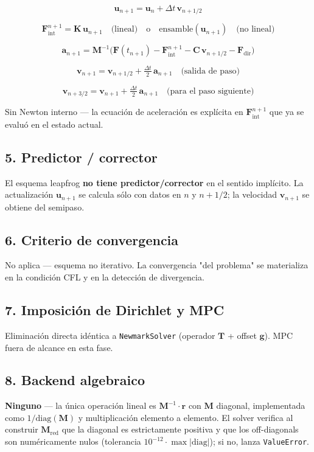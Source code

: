 \documentclass[11pt,letterpaper,oneside]{report}
\begin{document}
\[
\mathbf{u}_{n+1} = \mathbf{u}_n + \Delta t\,\mathbf{v}_{n+1/2}
\]

\[
\mathbf{F}_\text{int}^{n+1} = \mathbf{K}\,\mathbf{u}_{n+1} \quad\text{(lineal)} \quad\text{o}\quad \text{ensamble}(\mathbf{u}_{n+1}) \quad\text{(no lineal)}
\]

\[
\mathbf{a}_{n+1} = \mathbf{M}^{-1}\big(\mathbf{F}(t_{n+1}) - \mathbf{F}_\text{int}^{n+1} - \mathbf{C}\,\mathbf{v}_{n+1/2} - \mathbf{F}_\text{dir}\big)
\]

\[
\mathbf{v}_{n+1} = \mathbf{v}_{n+1/2} + \tfrac{\Delta t}{2}\,\mathbf{a}_{n+1} \quad\text{(salida de paso)}
\]

\[
\mathbf{v}_{n+3/2} = \mathbf{v}_{n+1} + \tfrac{\Delta t}{2}\,\mathbf{a}_{n+1} \quad\text{(para el paso siguiente)}
\]

Sin Newton interno --- la ecuación de aceleración es explícita en $\mathbf{F}_\text{int}^{n+1}$ que ya se evaluó en el estado actual.

\subsection{5. Predictor / corrector}

El esquema leapfrog \textbf{no tiene predictor/corrector} en el sentido implícito. La actualización $\mathbf{u}_{n+1}$ se calcula sólo con datos en $n$ y $n+1/2$; la velocidad $\mathbf{v}_{n+1}$ se obtiene del semipaso.

\subsection{6. Criterio de convergencia}

No aplica --- esquema no iterativo. La convergencia "del problema" se materializa en la condición CFL y en la detección de divergencia.

\subsection{7. Imposición de Dirichlet y MPC}

Eliminación directa idéntica a \texttt{NewmarkSolver} (operador $\mathbf{T}$ + offset $\mathbf{g}$). MPC fuera de alcance en esta fase.

\subsection{8. Backend algebraico}

\textbf{Ninguno} --- la única operación lineal es $\mathbf{M}^{-1} \cdot \mathbf{r}$ con $\mathbf{M}$ diagonal, implementada como $1/\text{diag}(\mathbf{M})$ y multiplicación elemento a elemento. El solver verifica al construir $\mathbf{M}_\text{red}$ que la diagonal es estrictamente positiva y que los off-diagonals son numéricamente nulos (tolerancia $10^{-12} \cdot \max|\text{diag}|$); si no, lanza \texttt{ValueError}.
\end{document}
